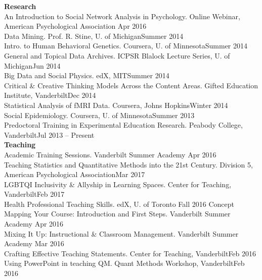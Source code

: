 %
{\large \textbf{Research}}\\
An Introduction to Social Network Analysis in Psychology. Online Webinar, American Psychological Association \hfill{Apr 2016}\smallskip\\
Data Mining. Prof. R. Stine, U. of Michigan\hfill{Summer 2014}\smallskip\\
Intro. to Human Behavioral Genetics. Coursera, U. of Minnesota\hfill{Summer 2014}%
\smallskip\\
General and Topical Data Archives. ICPSR Blalock Lecture Series, U. of Michigan\hfill{Jun 2014}\smallskip\\
Big Data and Social Physics. edX, MIT\hfill{Summer 2014}%
\smallskip\\
Critical \& Creative Thinking Models Across the Content Areas. Gifted Education Institute, Vanderbilt\hfill{Dec 2014}\smallskip\\
Statistical Analysis of fMRI Data. Coursera, Johns Hopkins\hfill{Winter 2014}%
\smallskip\\
Social Epidemiology. Coursera, U. of Minnesota\hfill{Summer 2013}%
\smallskip\\
Predoctoral Training in Experimental Education Research. Peabody College, Vanderbilt\hfill{Jul 2013 – Present}\smallskip\\
%
%
{\large {\bf Teaching}}\\
Academic Training Sessions. Vanderbilt Summer Academy \hfill{Apr 2016}\smallskip\\
Teaching Statistics and Quantitative Methods into the 21st Century. Division 5,  American Psychological Association\hfill{Mar 2017}\smallskip\\
LGBTQI Inclusivity & Allyship in Learning Spaces.  Center for Teaching, Vanderbilt\hfill{Feb 2017}\smallskip\\
Health Professional Teaching Skills. edX, U. of Toronto \hfill{Fall 2016}%
Concept Mapping Your Course: Introduction and First Steps. Vanderbilt Summer Academy \hfill{Apr 2016}\smallskip\\
Mixing It Up: Instructional \& Classroom Management. Vanderbilt Summer Academy \hfill{Mar 2016}\smallskip\\
Crafting Effective Teaching Statements. Center for Teaching, Vanderbilt\hfill{Feb 2016}\smallskip\\
Using PowerPoint in teaching QM. Quant Methods Workshop, Vanderbilt\hfill{Feb 2016}\smallskip\\

